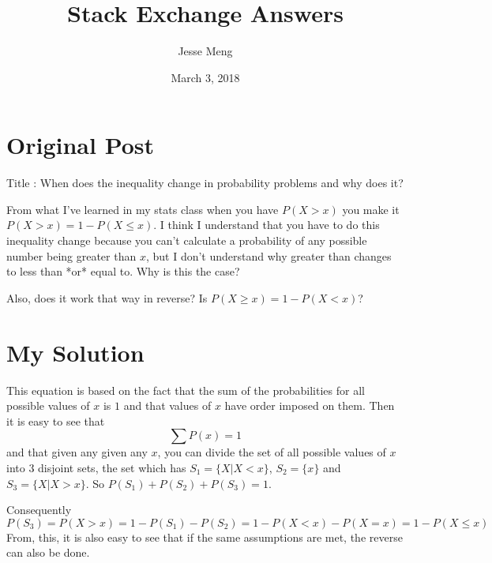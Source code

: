 \documentclass{article}
\title{Stack Exchange Answers}
\author{Jesse Meng }
\date{March 3, 2018}
\begin{document}
\maketitle

\section{Original Post}
Title : When does the inequality change in probability problems and why does it?

From what I've learned in my stats class when you have $P(X \gt x)$ you make it $P(X \gt x) = 1-P(X \le x)$. I think I understand that you have to do this inequality change because you can't calculate a probability of any possible number being greater than $x$, but I don't understand why greater than changes to less than *or* equal to. Why is this the case?

Also, does it work that way in reverse? Is $P(X \ge x)=1-P(X \lt x)$? 
\section{My Solution}
This equation is based on the fact that the sum of the probabilities for all possible values of $x$ is $1$ and that values of $x$ have order imposed on them. Then it is easy to see that $$ \sum P(x)=1 $$ and that given any given any $x$, you can divide the set of all possible values of $x$ into $3$ disjoint sets, the set which has $ S_1 = \{ X | X < x \}$, $S_2 = \{x\}$ and $S_3 = \{X | X > x\}.$ So $P(S_1)+P(S_2)+P(S_3) = 1$.

Consequently $ P(S_3) = P(X > x) = 1-P(S_1)-P(S_2) = 1- P(X<x)-P(X=x) = 1-P(X\leq x)$
From, this, it is also easy to see that if the same assumptions are met, the reverse can also be done.
\end{document}
